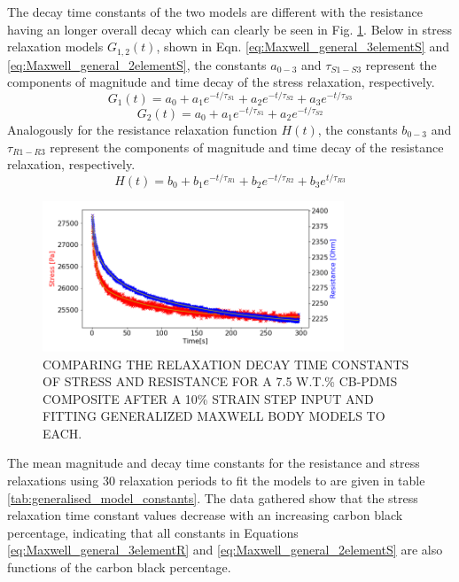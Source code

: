 The decay time constants of the two models are different with the resistance having an longer overall decay which can clearly be seen in Fig. \ref{fig:diff_tau_res_stress}. Below in stress relaxation models $G_{1,2}(t)$, shown in Eqn. \ref{eq:Maxwell_general_3elementS} and \ref{eq:Maxwell_general_2elementS}, the constants $a_{0-3}$ and $\tau_{S1-S3}$ represent the components of magnitude and time decay of the stress relaxation, respectively.
\begin{equation}
    G_1(t) = a_0 + a_1e^{-t/\tau_{S1}} + a_2e^{-t/\tau_{S2}} + a_3e^{-t/\tau_{S3}}
     \label{eq:Maxwell_general_3elementS} 
\end{equation}
\begin{equation}
    G_2(t) = a_0 + a_1e^{-t/\tau_{S1}} + a_2e^{-t/\tau_{S2}}
     \label{eq:Maxwell_general_2elementS} 
\end{equation}
Analogously for the resistance relaxation function $H(t)$, the constants $b_{0-3}$ and $\tau_{R1-R3}$ represent the components of magnitude and time decay of the resistance relaxation, respectively. 
\begin{equation}
    H(t) = b_0 + b_1e^{-t/\tau_{R1}} + b_2e^{-t/\tau_{R2}} + b_3e^{t/\tau_{R3}}
     \label{eq:Maxwell_general_3elementR} 
\end{equation}
\begin{figure}[H]
    \centering
    \includegraphics[width=9cm]{Figures/diff_time_const_Res_Stress_2_7-5_Epin_20mm_v3_pulse_6.png}
    \caption{COMPARING THE RELAXATION DECAY TIME CONSTANTS OF STRESS AND RESISTANCE FOR A 7.5 W.T.\% CB-PDMS COMPOSITE AFTER A 10\% STRAIN STEP INPUT AND FITTING GENERALIZED MAXWELL BODY MODELS TO EACH.}
    \label{fig:diff_tau_res_stress}
\end{figure}
The mean magnitude and decay time constants for the resistance and stress relaxations using 30 relaxation periods to fit the models to are given in table \ref{tab:generalised_model_constants}. The data gathered show that the stress relaxation time constant values decrease with an increasing carbon black percentage, indicating that all constants in Equations \ref{eq:Maxwell_general_3elementR} and \ref{eq:Maxwell_general_2elementS} are also functions of the carbon black percentage.

